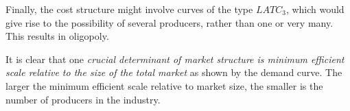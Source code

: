 Finally, the cost structure might involve curves of the type $LATC_3$, which
would give rise to the possibility of several producers, rather than one or
very many. This results in oligopoly.

It is clear that one \textit{crucial determinant of market structure is
	minimum efficient scale relative to the size of the total market} as shown
by the demand curve. The larger the minimum efficient scale relative to
market size, the smaller is the number of producers in the industry.